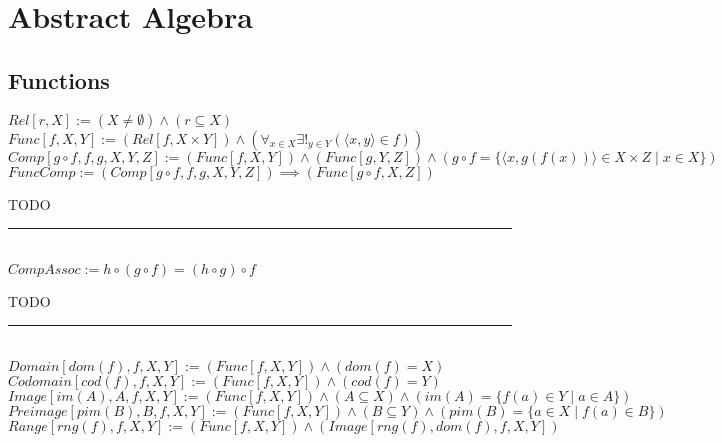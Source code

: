 \documentclass{book}
\newcommand{\abr}{:=}
\newcommand{\st}{\mathbin{|}}
\begin{document}




\chapter{Abstract Algebra}
\section{Functions}
$Rel[r, X] \abr (X \neq \emptyset) \land (r \subseteq X)$ \\
$Func[f, X, Y] \abr (Rel[f, X \times Y]) \land (\forall_{x \in X} \exists!_{y \in Y}(\langle x, y \rangle \in f))$ \\
$Comp[g \circ f, f, g, X, Y, Z] \abr (Func[f, X, Y]) \land (Func[g, Y, Z]) \land (g \circ f = \{\langle x, g(f(x)) \rangle \in X \times Z \st x \in X\})$ \\

$FuncComp \abr (Comp[g \circ f, f, g, X, Y, Z]) \implies (Func[g \circ f, X, Z])$
\begin{enumerate}
  \lit TODO
\end{enumerate} \vspace{.75mm} \hrule \vspace{.75mm} \ \\ 

$CompAssoc \abr h \circ (g \circ f) = (h \circ g) \circ f$
\begin{enumerate}
  \lit TODO
\end{enumerate} \vspace{.75mm} \hrule \vspace{.75mm} \ \\ 

$Domain[dom(f), f, X, Y] \abr (Func[f, X, Y]) \land (dom(f) = X)$ \\
$Codomain[cod(f), f, X, Y] \abr (Func[f, X, Y]) \land (cod(f) = Y)$ \\
$Image[im(A), A, f, X, Y] \abr (Func[f, X, Y]) \land (A \subseteq X) \land (im(A) = \{f(a) \in Y \st a \in A\})$ \\
$Preimage[pim(B), B, f, X, Y] \abr (Func[f, X, Y]) \land (B \subseteq Y) \land (pim(B) = \{a \in X \st f(a) \in B\})$ \\
$Range[rng(f), f, X, Y] \abr (Func[f, X, Y]) \land (Image[rng(f), dom(f), f, X, Y])$ \\
\end{document}
